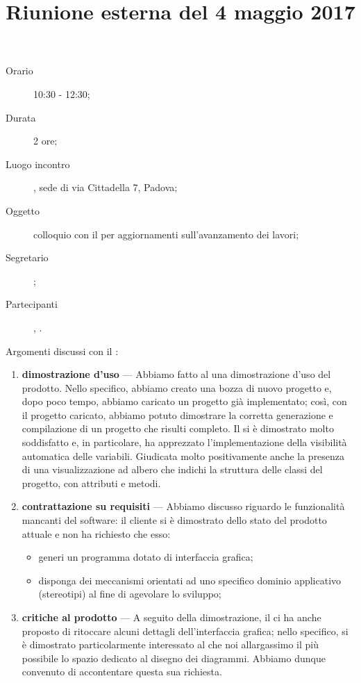 


\author{\LS}
\supervisor{\AZ}
\title{Riunione esterna del 4 maggio 2017}



\maketitle

\begin{description}
	\item[Orario] 10:30 - 12:30;
	\item[Durata] 2 ore;
	\item[Luogo incontro] \ZU, sede di via Cittadella 7, Padova;
	\item[Oggetto] colloquio con il \GP{} per aggiornamenti sull'avanzamento dei lavori;
	\item[Segretario] \LB; 
	\item[Partecipanti] \GP, \ALL.
\end{description}

Argomenti discussi con il \GP:
\begin{enumerate}
	\item \textbf{dimostrazione d'uso} --- Abbiamo fatto al \GP{} una dimostrazione d'uso del prodotto. Nello specifico, abbiamo creato una bozza di nuovo progetto e, dopo poco tempo, abbiamo caricato un progetto già implementato; così, con il progetto caricato, abbiamo potuto dimostrare la corretta generazione e compilazione di un progetto che risulti completo. Il \GP{} si è dimostrato molto soddisfatto e, in particolare, ha apprezzato l'implementazione della visibilità automatica delle variabili. Giudicata molto positivamente anche la presenza di una visualizzazione ad albero che indichi la struttura delle classi del progetto, con attributi e metodi.
	\item \textbf{contrattazione su requisiti} --- Abbiamo discusso riguardo le funzionalità mancanti del software: il cliente si è dimostrato dello stato del prodotto attuale e non ha richiesto che esso:
	\begin{itemize}
		\item generi un programma dotato di interfaccia grafica;
		\item disponga dei meccanismi orientati ad uno specifico dominio applicativo (stereotipi) al fine di agevolare lo sviluppo;
		
	\end{itemize}
	\item \textbf{critiche al prodotto} --- A seguito della dimostrazione, il \GP{} ci ha anche proposto di ritoccare alcuni dettagli dell'interfaccia grafica; nello specifico, si è dimostrato particolarmente interessato al che noi allargassimo il più possibile lo spazio dedicato al disegno dei diagrammi. Abbiamo dunque convenuto di accontentare questa sua richiesta.
\end{enumerate}


